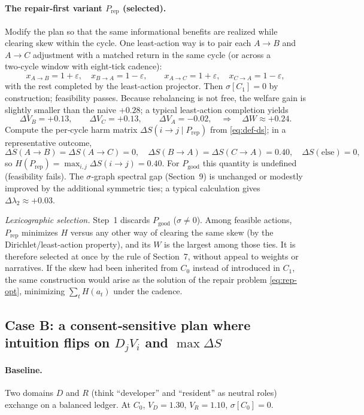 \documentclass[11pt]{article}
\begin{document}
\paragraph{The repair‑first variant $P_{\text{rep}}$ (selected).}
Modify the plan so that the same informational benefits are realized while clearing skew within the cycle. One least‑action way is to pair each $A\!\to\!B$ and $A\!\to\!C$ adjustment with a matched return in the same cycle (or across a two‑cycle window with eight‑tick cadence):
\[
x_{A\to B}=1+\varepsilon,\quad x_{B\to A}=1-\varepsilon,\qquad
x_{A\to C}=1+\varepsilon,\quad x_{C\to A}=1-\varepsilon,
\]
with the rest completed by the least‑action projector. Then $\sigma[C_1]=0$ by construction; feasibility passes. Because rebalancing is not free, the welfare gain is slightly smaller than the naive $+0.28$; a typical least‑action completion yields
\[
\Delta V_B=+0.13,\qquad \Delta V_C=+0.13,\qquad \Delta V_A=-0.02,
\quad\Rightarrow\quad \Delta W\approx+0.24.
\]
Compute the per‑cycle harm matrix $\Delta S(i\!\to\!j\mid P_{\text{rep}})$ from \eqref{eq:def-ds}; in a representative outcome,
\[
\Delta S(A\!\to\!B)=\Delta S(A\!\to\!C)=0,\quad
\Delta S(B\!\to\!A)=\Delta S(C\!\to\!A)=0.40,\quad
\Delta S(\text{else})=0,
\]
so $H(P_{\text{rep}})=\max_{i,j}\Delta S(i\!\to\!j)=0.40$. For $P_{\text{good}}$ this quantity is undefined (feasibility fails). The $\sigma$‑graph spectral gap (Section~9) is unchanged or modestly improved by the additional symmetric ties; a typical calculation gives $\Delta\lambda_2\approx +0.03$.

\emph{Lexicographic selection.} Step~1 discards $P_{\text{good}}$ ($\sigma\neq 0$). Among feasible actions, $P_{\text{rep}}$ minimizes $H$ versus any other way of clearing the same skew (by the Dirichlet/least‑action property), and its $W$ is the largest among those ties. It is therefore selected at once by the rule of Section~7, without appeal to weights or narratives. If the skew had been inherited from $C_0$ instead of introduced in $C_1$, the same construction would arise as the solution of the repair problem \eqref{eq:rep-opt}, minimizing $\sum_t H(a_t)$ under the cadence.

\subsection*{Case B: a consent‑sensitive plan where intuition flips on $D_j V_i$ and $\max\Delta S$}

\paragraph{Baseline.}
Two domains $D$ and $R$ (think ``developer'' and ``resident'' as neutral roles) exchange on a balanced ledger. At $C_0$, $V_D=1.30$, $V_R=1.10$, $\sigma[C_0]=0$.
\end{document}
